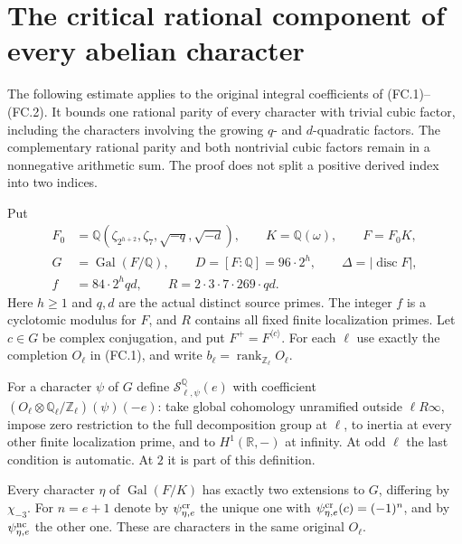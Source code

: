 \section{The critical rational component of every abelian character}
\label{sec:critical-abelian-component-bound}

The following estimate applies to the original integral coefficients of
(FC.1)--(FC.2).  It bounds one rational parity of every character with
trivial cubic factor, including the characters involving the growing
$q$- and $d$-quadratic factors.  The complementary rational parity and
both nontrivial cubic factors remain in a nonnegative arithmetic sum.
The proof does not split a positive derived index into two indices.

Put
\[
 \begin{split}
 F_0&=\mathbb Q(\zeta_{2^{h+2}},\zeta_7,
                       \sqrt{-q},\sqrt{-d}),\qquad
 K=\mathbb Q(\omega),\qquad F=F_0K,\\
 G&=\operatorname{Gal}(F/\mathbb Q),\qquad
 D=[F:\mathbb Q]=96\cdot2^h,\qquad
 \Delta=|\operatorname{disc}F|,\\
 f&=84\cdot2^hqd,\qquad R=2\cdot3\cdot7\cdot269\cdot qd .
 \end{split}                                                    \tag{CP.1}
\]
Here $h\geq1$ and $q,d$ are the actual distinct source primes.
The integer $f$ is a cyclotomic modulus for $F$, and $R$ contains
all fixed finite localization primes.  Let $c\in G$ be complex
conjugation, and put $F^+=F^{\langle c\rangle}$.
For each $\ell$ use exactly the completion $O_\ell$ in (FC.1), and
write $b_\ell=\operatorname{rank}_{\mathbb Z_\ell}O_\ell$.

For a character $\psi$ of $G$ define $\mathcal S^{\mathbb Q}_{\ell,\psi}(e)$
with coefficient
$(O_\ell\otimes\mathbb Q_\ell/\mathbb Z_\ell)(\psi)(-e)$:
take global cohomology unramified outside $\ell R\infty$, impose
zero restriction to the full decomposition group at $\ell$, to
inertia at every other finite localization prime, and to
$H^1(\mathbb R,-)$ at infinity.  At odd $\ell$ the last condition
is automatic.  At $2$ it is part of this definition.

Every character $\eta$ of $\operatorname{Gal}(F/K)$ has exactly two
extensions to $G$, differing by $\chi_{-3}$.  For $n=e+1$ denote
by $\psi_{\eta,e}^{\rm cr}$ the unique one with
$\psi_{\eta,e}^{\rm cr}(c)=(-1)^n$, and by
$\psi_{\eta,e}^{\rm nc}$ the other one.
These are characters in the same original $O_\ell$.

